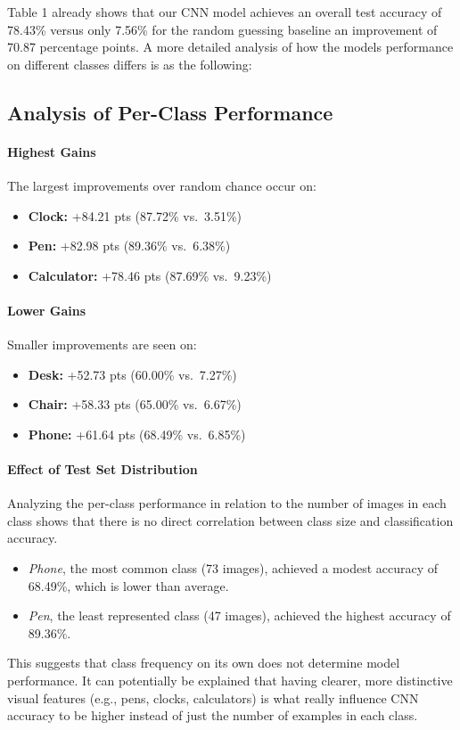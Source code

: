 \documentclass[10pt]{article}
\begin{document}
Table 1 already shows that our CNN model achieves an overall test accuracy of 78.43\% versus only 7.56\% for the random guessing baseline an improvement of 
70.87 percentage points. A more detailed analysis of how the models performance on different classes differs is as the following:

\subsection{Analysis of Per-Class Performance}
\paragraph{Highest Gains}  
The largest improvements over random chance occur on:
\begin{itemize}
  \item \textbf{Clock:} +84.21 pts (87.72\% vs.\ 3.51\%)
  \item \textbf{Pen:}   +82.98 pts (89.36\% vs.\ 6.38\%)
  \item \textbf{Calculator:} +78.46 pts (87.69\% vs.\ 9.23\%)
\end{itemize}

\paragraph{Lower Gains}  
Smaller improvements are seen on:
\begin{itemize}
  \item \textbf{Desk:} +52.73 pts (60.00\% vs.\ 7.27\%)
  \item \textbf{Chair:} +58.33 pts (65.00\% vs.\ 6.67\%)
  \item \textbf{Phone:} +61.64 pts (68.49\% vs.\ 6.85\%)
\end{itemize}

\paragraph{Effect of Test Set Distribution}
Analyzing the per-class performance in relation to the number of images in each class shows that there is no direct correlation between class size and classification accuracy.
\begin{itemize}
  \item \emph{Phone}, the most common class (73 images), achieved a modest accuracy of 68.49\%, which is lower than average.
  \item \emph{Pen}, the least represented class (47 images), achieved the highest accuracy of 89.36\%.
\end{itemize}
This suggests that class frequency on its own does not determine model performance. It can potentially be explained that having clearer, more distinctive visual features (e.g., pens, clocks, calculators)
is what really influence CNN accuracy to be higher instead of just the number of examples in each class.
\end{document}
